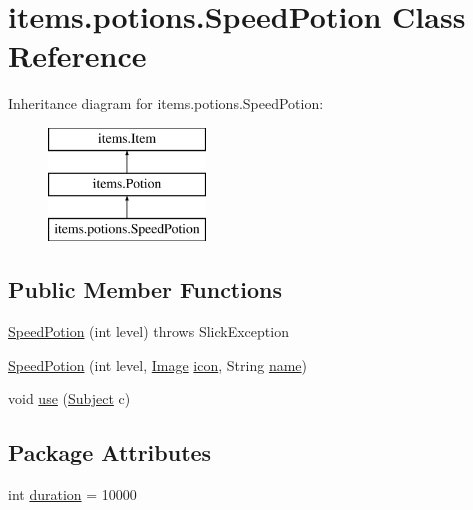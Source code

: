 \hypertarget{classitems_1_1potions_1_1_speed_potion}{}\section{items.\+potions.\+Speed\+Potion Class Reference}
\label{classitems_1_1potions_1_1_speed_potion}
Inheritance diagram for items.\+potions.\+Speed\+Potion\+:\begin{figure}[H]
\begin{center}
\leavevmode
\includegraphics[height=3.000000cm]{classitems_1_1potions_1_1_speed_potion}
\end{center}
\end{figure}
\subsection*{Public Member Functions}
\begin{DoxyCompactItemize}
\item 
\mbox{\hyperlink{classitems_1_1potions_1_1_speed_potion_a5d015761f8fd01edfd4779d532d1dcae}{Speed\+Potion}} (int level)  throws Slick\+Exception 
\item 
\mbox{\hyperlink{classitems_1_1potions_1_1_speed_potion_a086bb833594251d682a31c2050598ba3}{Speed\+Potion}} (int level, \mbox{\hyperlink{classorg_1_1newdawn_1_1slick_1_1_image}{Image}} \mbox{\hyperlink{classitems_1_1_item_afa445ad011d48c3455b0c04bec2581f9}{icon}}, String \mbox{\hyperlink{classitems_1_1_item_a086327df1ba046bbbe3fa2f753226d73}{name}})
\item 
void \mbox{\hyperlink{classitems_1_1potions_1_1_speed_potion_ad9b7c55659e5eb0a43b2a4b3f164d3aa}{use}} (\mbox{\hyperlink{classentities_1_1_subject}{Subject}} c)
\end{DoxyCompactItemize}
\subsection*{Package Attributes}
\begin{DoxyCompactItemize}
\item 
int \mbox{\hyperlink{classitems_1_1potions_1_1_speed_potion_a4b068bd8e0be9c84fe4711fc486eeacc}{duration}} = 10000
\end{DoxyCompactItemize}
